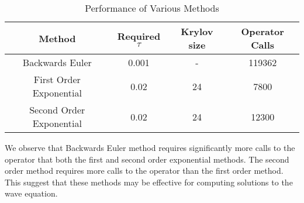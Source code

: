 \begin{table}[H]
    \centering
    \begin{tabular}{| c | c | c | c |}
    \hline
    Method & Required $\tau$ & Krylov size & Operator Calls\\
    \hline
    Backwards Euler & 0.001 & - & 119362 \\
    First Order Exponential & 0.02 & 24 & 7800 \\
    Second Order Exponential & 0.02 & 24 & 12300 \\
    \hline
    \end{tabular}
    \caption{Performance of Various Methods}
    \label{tab:reduced_data}
\end{table}

We observe that Backwards Euler method requires significantly more calls to the operator that both the first and second order exponential methods.
The second order method requires more calls to the operator than the first order method.
This suggest that these methods may be effective for computing solutions to the wave equation.